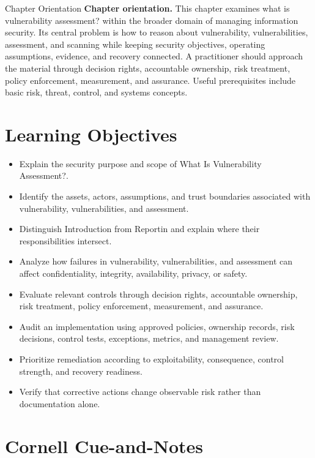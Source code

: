 \documentclass[11pt,letterpaper]{article}
\title{\CornellDocumentTitle}
\author{}
\date{}
\begin{document}
\maketitle
\begin{CornellOverviewBox}{Chapter Orientation}
\textbf{Chapter orientation.} This chapter examines what is vulnerability assessment? within the broader domain of managing information security. Its central problem is how to reason about vulnerability, vulnerabilities, assessment, and scanning while keeping security objectives, operating assumptions, evidence, and recovery connected. A practitioner should approach the material through decision rights, accountable ownership, risk treatment, policy enforcement, measurement, and assurance. Useful prerequisites include basic risk, threat, control, and systems concepts.
\end{CornellOverviewBox}
\section*{Learning Objectives}
\begin{itemize}
\item Explain the security purpose and scope of What Is Vulnerability Assessment?.
\item Identify the assets, actors, assumptions, and trust boundaries associated with vulnerability, vulnerabilities, and assessment.
\item Distinguish Introduction from Reportin and explain where their responsibilities intersect.
\item Analyze how failures in vulnerability, vulnerabilities, and assessment can affect confidentiality, integrity, availability, privacy, or safety.
\item Evaluate relevant controls through decision rights, accountable ownership, risk treatment, policy enforcement, measurement, and assurance.
\item Audit an implementation using approved policies, ownership records, risk decisions, control tests, exceptions, metrics, and management review.
\item Prioritize remediation according to exploitability, consequence, control strength, and recovery readiness.
\item Verify that corrective actions change observable risk rather than documentation alone.
\end{itemize}
\section*{Cornell Cue-and-Notes}
\end{document}
